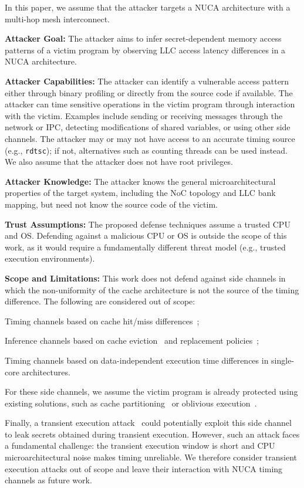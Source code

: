 In this paper, we assume that the attacker targets a NUCA architecture with a multi-hop mesh interconnect.

\textbf{Attacker Goal:}
The attacker aims to infer secret-dependent memory access patterns of a victim program by observing LLC access latency differences in a NUCA architecture.

\textbf{Attacker Capabilities:}
The attacker can identify a vulnerable access pattern either through binary profiling or directly from the source code if available.
The attacker can time sensitive operations in the victim program through interaction with the victim.
Examples include sending or receiving messages through the network or IPC, detecting modifications of shared variables, or using other side channels.
The attacker may or may not have access to an accurate timing source (e.g., \texttt{rdtsc}); if not, alternatives such as counting threads can be used instead.
We also assume that the attacker does not have root privileges.

\textbf{Attacker Knowledge:}
The attacker knows the general microarchitectural properties of the target system, including the NoC topology and LLC bank mapping, but need not know the source code of the victim.

\textbf{Trust Assumptions:}
The proposed defense techniques assume a trusted CPU and OS.
Defending against a malicious CPU or OS is outside the scope of this work, as it would require a fundamentally different threat model (e.g., trusted execution environments).

\textbf{Scope and Limitations:}
This work does not defend against side channels in which the non-uniformity of the cache architecture is not the source of the timing difference.
The following are considered out of scope:
\begin{compactitem}
    \item Timing channels based on cache hit/miss differences~\cite{osvik2006cache};
    \item Inference channels based on cache eviction~\cite{yarom2014flush+,irazoqui2015s,liu2015last,gruss2015cache} and replacement policies~\cite{lru-sidechannel};
    \item Timing channels based on data-independent execution time differences in single-core architectures.
\end{compactitem}
For these side channels, we assume the victim program is already protected using existing solutions, such as cache partitioning~\cite{kiriansky2018dawg} or oblivious execution~\cite{oram,phantom}.

Finally, a transient execution attack~\cite{spectre,meltdown} could potentially exploit this side channel to leak secrets obtained during transient execution.
However, such an attack faces a fundamental challenge: the transient execution window is short and CPU microarchitectural noise makes timing unreliable.
We therefore consider transient execution attacks out of scope and leave their interaction with NUCA timing channels as future work.
